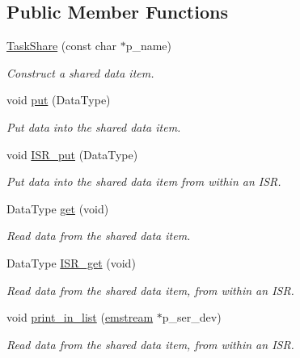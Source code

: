 \subsection*{Public Member Functions}
\begin{DoxyCompactItemize}
\item 
\mbox{\hyperlink{class_task_share_a9e49e43c6da3859b9690a62ad64d7f40}{Task\+Share}} (const char $\ast$p\+\_\+name)
\begin{DoxyCompactList}\small\item\em Construct a shared data item. \end{DoxyCompactList}\item 
void \mbox{\hyperlink{class_task_share_ae1cf7a4f95975446adcfa947d9dabf82}{put}} (Data\+Type)
\begin{DoxyCompactList}\small\item\em Put data into the shared data item. \end{DoxyCompactList}\item 
void \mbox{\hyperlink{class_task_share_a78de768fa4760c6e8f74c7795ff164c7}{I\+S\+R\+\_\+put}} (Data\+Type)
\begin{DoxyCompactList}\small\item\em Put data into the shared data item from within an I\+SR. \end{DoxyCompactList}\item 
Data\+Type \mbox{\hyperlink{class_task_share_a0cf8afd4f4d90c1e91ff2af9a004ecec}{get}} (void)
\begin{DoxyCompactList}\small\item\em Read data from the shared data item. \end{DoxyCompactList}\item 
Data\+Type \mbox{\hyperlink{class_task_share_a5a4bac78053046c248896441a5b3a839}{I\+S\+R\+\_\+get}} (void)
\begin{DoxyCompactList}\small\item\em Read data from the shared data item, from within an I\+SR. \end{DoxyCompactList}\item 
void \mbox{\hyperlink{class_task_share_a08835a91ed7ccd847cefe6ff72fe22e6}{print\+\_\+in\+\_\+list}} (\mbox{\hyperlink{classemstream}{emstream}} $\ast$p\+\_\+ser\+\_\+dev)
\begin{DoxyCompactList}\small\item\em Read data from the shared data item, from within an I\+SR. \end{DoxyCompactList}\item 

\end{DoxyCompactItemize}

